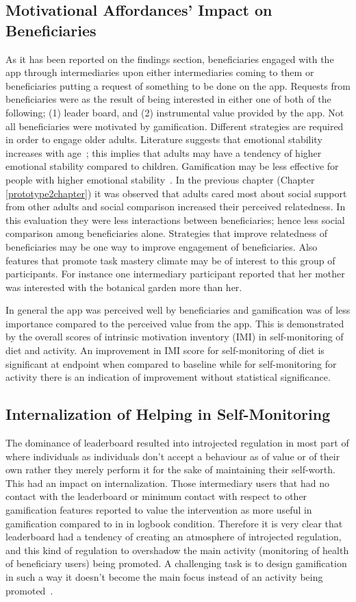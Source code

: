 \subsection{Motivational Affordances' Impact on Beneficiaries}
As it has been reported on the findings section, beneficiaries engaged with the app through intermediaries upon either intermediaries coming to them or beneficiaries putting a request of something to be done on the app. Requests from beneficiaries were as the result of being interested in either one of both of the following; (1) leader board, and (2) instrumental value provided by the app. Not all beneficiaries were motivated by gamification. Different strategies are required in order to engage older adults. Literature suggests that emotional stability increases with age~\citep{carstensen2011emotional}; this implies that adults may have a tendency of higher emotional stability compared to children. Gamification may be less effective for people with higher emotional stability~\citep{jia2016personality}. In the previous chapter (Chapter \ref{prototype2chapter}) it was observed that adults cared most about social support from other adults and social comparison increased their perceived relatedness. In this evaluation they were less interactions between beneficiaries; hence less social comparison among beneficiaries alone. Strategies that improve relatedness of beneficiaries may be one way to improve engagement of beneficiaries. Also features that promote task mastery climate may be of interest to this group of participants. For instance one intermediary participant reported that her mother was interested with the botanical garden more than her. 

In general the app was perceived well by beneficiaries and gamification was of less importance compared to the perceived value from the app. This is demonstrated by the overall scores of intrinsic motivation inventory (IMI) in self-monitoring of diet and activity. An improvement in IMI score for self-monitoring of diet is significant at endpoint when compared to baseline while for self-monitoring for activity there is an indication of improvement without statistical significance.      
\subsection{Internalization of Helping in Self-Monitoring}
The dominance of leaderboard resulted into introjected regulation in most part of where individuals as individuals don't accept a behaviour as of value or of their own rather they merely perform it for the sake of maintaining their self-worth. This had an impact on internalization. Those intermediary users that had no contact with the leaderboard or minimum contact with respect to other gamification features reported to value the intervention as more useful in gamification compared to in in logbook condition. Therefore it is very clear that leaderboard had a tendency of creating an atmosphere of introjected regulation, and this kind of regulation  to overshadow the main activity  (monitoring of health of beneficiary users) being promoted. A challenging task is to design gamification in such a way it doesn't become the main focus instead of an activity being promoted~\citep{knaving2013designing}.

